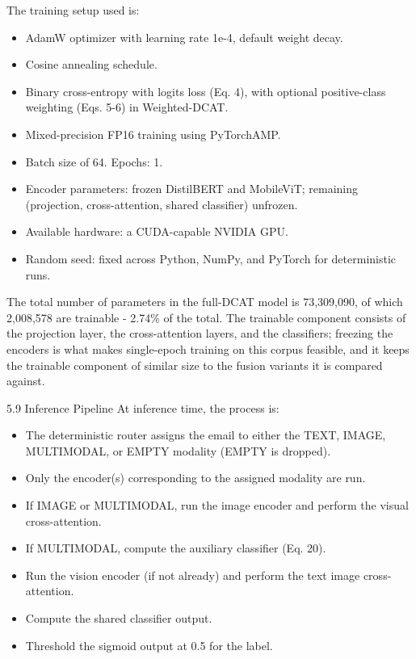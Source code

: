 \documentclass[10pt,twoside]{article}
\begin{document}
The training setup used is:

\begin{itemize}[leftmargin=*,itemsep=1.5pt]
\item AdamW \citep{loshchilov2019adamw} optimizer with learning rate 1e-4, default weight decay.
\item Cosine annealing schedule.
\item Binary cross-entropy with logits loss (Eq. 4), with optional positive-class weighting (Eqs. 5-6) in Weighted-DCAT.
\item Mixed-precision FP16 training using PyTorchAMP.
\item Batch size of 64. Epochs: 1.
\item Encoder parameters: frozen DistilBERT and MobileViT; remaining (projection, cross-attention, shared classifier) unfrozen.
\item Available hardware: a CUDA-capable NVIDIA GPU.
\item Random seed: fixed across Python, NumPy, and PyTorch for deterministic runs.
\end{itemize}

The total number of parameters in the full-DCAT model is 73,309,090, of which 2,008,578 are trainable - 2.74\% of the total. The trainable component consists of the projection layer, the cross-attention layers, and the classifiers; freezing the encoders is what makes single-epoch training on this corpus feasible, and it keeps the trainable component of similar size to the fusion variants it is compared against.

5.9 Inference Pipeline At inference time, the process is:

\begin{itemize}[leftmargin=*,itemsep=1.5pt]
\item The deterministic router assigns the email to either the TEXT, IMAGE, MULTIMODAL, or EMPTY modality (EMPTY is dropped).
\item Only the encoder(s) corresponding to the assigned modality are run.
\item If IMAGE or MULTIMODAL, run the image encoder and perform the visual cross-attention.
\item If MULTIMODAL, compute the auxiliary classifier (Eq. 20).
\item Run the vision encoder (if not already) and perform the text image cross-attention.
\item Compute the shared classifier output.
\item Threshold the sigmoid output at 0.5 for the label.
\end{itemize}
\end{document}
